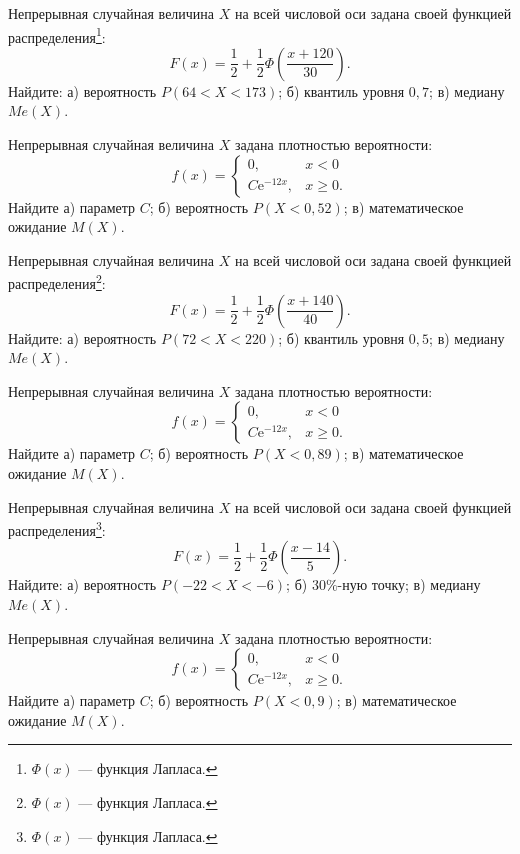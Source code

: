 \vfill

\newpage\setcounter{zad}{0}

\z Непрерывная случайная величина $X$ на всей числовой оси задана своей функцией распределения\footnote{$\Phi(x)$ --- функция Лапласа.}: $$ F(x) = \frac{1}{2} + \frac{1}{2}\Phi\left( \frac{x + 120}{30} \right). $$ Найдите: а) вероятность $P(64 < X < 173)$; б) квантиль уровня $0{,}7$; в) медиану $Me(X)$.


\vfill

\z Непрерывная случайная величина $X$ задана плотностью вероятности: $$ f(x) = \begin{cases}0, & x < 0 \\ C\mathrm{e}^{-12x}, & x \geqslant 0.\end{cases} $$ Найдите а) параметр $C$; б) вероятность $P(X < 0{,}52)$; в) математическое ожидание $M(X)$.
 

\vfill

\newpage\setcounter{zad}{0}

\z Непрерывная случайная величина $X$ на всей числовой оси задана своей функцией распределения\footnote{$\Phi(x)$ --- функция Лапласа.}: $$ F(x) = \frac{1}{2} + \frac{1}{2}\Phi\left( \frac{x + 140}{40} \right). $$ Найдите: а) вероятность $P(72 < X < 220)$; б) квантиль уровня $0{,}5$; в) медиану $Me(X)$.


\vfill

\z Непрерывная случайная величина $X$ задана плотностью вероятности: $$ f(x) = \begin{cases}0, & x < 0 \\ C\mathrm{e}^{-12x}, & x \geqslant 0.\end{cases} $$ Найдите а) параметр $C$; б) вероятность $P(X < 0{,}89)$; в) математическое ожидание $M(X)$.
 

\vfill

\newpage\setcounter{zad}{0}

\z Непрерывная случайная величина $X$ на всей числовой оси задана своей функцией распределения\footnote{$\Phi(x)$ --- функция Лапласа.}: $$ F(x) = \frac{1}{2} + \frac{1}{2}\Phi\left( \frac{x - 14}{5} \right). $$ Найдите: а) вероятность $P(-22 < X < -6)$; б) $30\%$-ную точку; в) медиану $Me(X)$.


\vfill

\z Непрерывная случайная величина $X$ задана плотностью вероятности: $$ f(x) = \begin{cases}0, & x < 0 \\ C\mathrm{e}^{-12x}, & x \geqslant 0.\end{cases} $$ Найдите а) параметр $C$; б) вероятность $P(X < 0{,}9)$; в) математическое ожидание $M(X)$.
 

